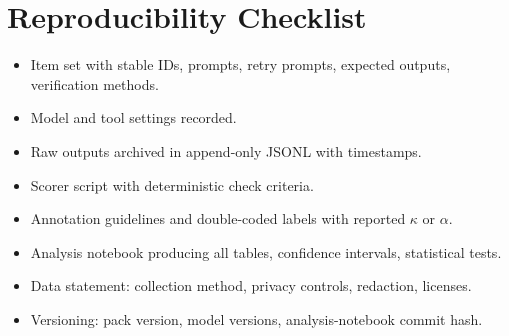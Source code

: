 \documentclass[11pt]{article}
\begin{document}
\section{Reproducibility Checklist}
\begin{itemize}[leftmargin=*]
  \item Item set with stable IDs, prompts, retry prompts, expected outputs, verification methods.
  \item Model and tool settings recorded.
  \item Raw outputs archived in append-only JSONL with timestamps.
  \item Scorer script with deterministic check criteria.
  \item Annotation guidelines and double-coded labels with reported $\kappa$ or $\alpha$.
  \item Analysis notebook producing all tables, confidence intervals, statistical tests.
  \item Data statement: collection method, privacy controls, redaction, licenses.
  \item Versioning: pack version, model versions, analysis-notebook commit hash.
\end{itemize}
\end{document}
